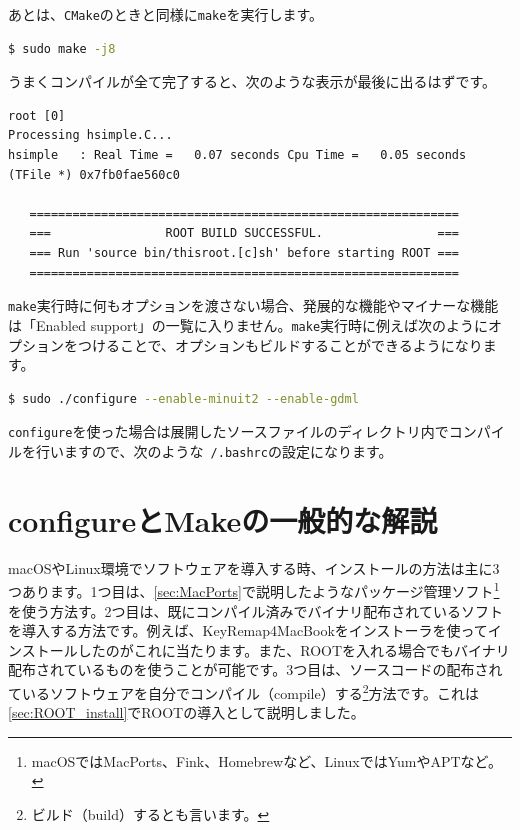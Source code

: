 あとは、\texttt{CMake}のときと同様に\texttt{make}を実行します。
\begin{lstlisting}[language=bash]
$ sudo make -j8
\end{lstlisting}
うまくコンパイルが全て完了すると、次のような表示が最後に出るはずです。
\begin{lstlisting}
root [0] 
Processing hsimple.C...
hsimple   : Real Time =   0.07 seconds Cpu Time =   0.05 seconds
(TFile *) 0x7fb0fae560c0
 
   ============================================================
   ===                ROOT BUILD SUCCESSFUL.                ===
   === Run 'source bin/thisroot.[c]sh' before starting ROOT ===
   ============================================================
\end{lstlisting}

\texttt{make}実行時に何もオプションを渡さない場合、発展的な機能やマイナーな機能は「Enabled support」の一覧に入りません。\texttt{make}実行時に例えば次のようにオプションをつけることで、オプションもビルドすることができるようになります。

\begin{lstlisting}[language=bash]
$ sudo ./configure --enable-minuit2 --enable-gdml
\end{lstlisting}

\texttt{configure}を使った場合は展開したソースファイルのディレクトリ内でコンパイルを行いますので、次のような\texttt{~/.bashrc}の設定になります。
\begin{NoFloat}

\end{NoFloat}

\section{configureとMakeの一般的な解説}

macOSやLinux環境でソフトウェアを導入する時、インストールの方法は主に3つあります。1つ目は、\ref{sec:MacPorts}で説明したようなパッケージ管理ソフト\footnote{macOSではMacPorts、Fink、Homebrewなど、LinuxではYumやAPTなど。}を使う方法す。2つ目は、既にコンパイル済みでバイナリ配布されているソフトを導入する方法です。例えば、KeyRemap4MacBookをインストーラを使ってインストールしたのがこれに当たります。また、ROOTを入れる場合でもバイナリ配布されているものを使うことが可能です。3つ目は、ソースコードの配布されているソフトウェアを自分でコンパイル（compile）する\footnote{ビルド（build）するとも言います。}方法です。これは\ref{sec:ROOT_install}でROOTの導入として説明しました。

